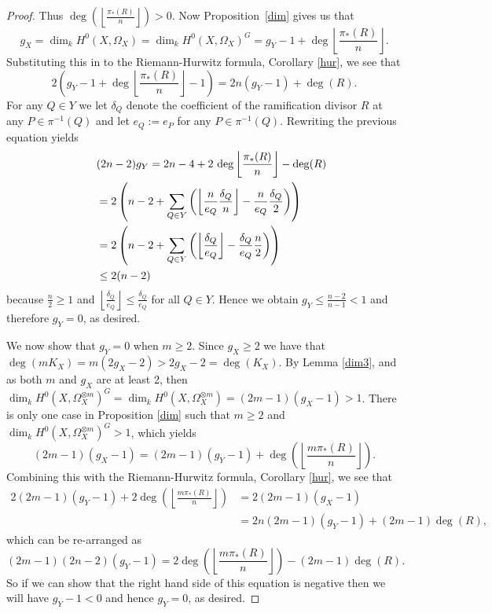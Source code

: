 \begin{proof}
    Thus $\deg\left( \left\lfloor \frac{\pi_*(R)}{n} \right\rfloor \right) >0$. 
    Now Proposition~\ref{dim} gives us that
        \begin{equation*}
        g_X=\dim_k H^0(X,\Omega_X)=\dim_k H^0(X,\Omega_X)^G= g_Y-1+\deg\left\lfloor \frac{\pi_*(R)}{n} \right\rfloor.
        \end{equation*}
    Substituting this in to the Riemann-Hurwitz formula, Corollary \ref{hur}, we see that
        \begin{equation*}
        2\left(g_Y - 1 + \deg\left \lfloor \frac{\pi_*(R)}{n} \right \rfloor -1 \right) = 2n (g_Y -1) + \deg(R).
        \end{equation*}
    For any $Q \in Y$ we let $\delta_Q$ denote the coefficient of the ramification divisor $R$ at any $P \in \pi^{-1}(Q)$ and let $e_Q := e_P$ for any $P \in \pi^{-1}(Q)$. 
    Rewriting the previous equation yields
        \begin{align*}
        \lefteqn{(2n-2)g_Y = 2n-4 + 2 \,\deg\left \lfloor \frac{\pi_*(R)}{n}\right \rfloor - \deg(R)}\\
        &= 2 \left(n-2 + \sum_{Q \in Y} \left(\left\lfloor \frac{n}{e_Q} \frac{\delta_Q}{n} \right\rfloor - \frac{n}{e_Q} \frac{\delta_Q}{2}\right) \right)\\
        &= 2 \left(n-2 + \sum_{Q \in Y} \left( \left\lfloor \frac{\delta_Q}{e_Q} \right\rfloor - \frac{\delta_Q}{e_Q} \frac{n}{2} \right)\right)\\
        & \le  2(n-2)
        \end{align*}
    because $\frac{n}{2} \ge 1$ and $\left\lfloor \frac{\delta_Q}{e_Q}\right\rfloor \le \frac{\delta_Q}{e_Q}$ for all $Q \in Y$. 
    Hence we obtain $g_Y \le \frac{n-2}{n-1} < 1$ and therefore $g_Y =0$, as desired.
    
    We now show that $g_Y=0$ when $m\geq 2$. 
    Since $g_X\geq 2$ we have that $\deg(mK_X)=m(2g_X-2)>2g_X-2=\deg(K_X)$.
    By Lemma \ref{dim3}, and as both $m$ and $g_X$ are at least 2, then $\dim_kH^0(X,\Omega_X^{\otimes m})^G=\dim_kH^0(X,\Omega_X^{\otimes m})=(2m-1)(g_X-1)>1$.
    There is only one case in Proposition \ref{dim} such that $m\geq 2$ and $\dim_k H^0(X,\Omega_X^{\otimes m})^G>1$, which yields 
        \begin{equation*}
        (2m-1)(g_X-1)=(2m-1)(g_Y-1)+\deg\left(\left\lfloor \frac{m\pi_*(R)}{n} \right\rfloor \right).
        \end{equation*}
    Combining this with the Riemann-Hurwitz formula, Corollary \ref{hur}, we see that
        \begin{align*}
        2(2m-1)(g_Y-1)+2\deg\left(\left\lfloor\frac{m\pi_*(R)}{n}\right\rfloor\right) & =  2(2m-1)(g_X-1)\\
        & =  2n(2m-1)(g_Y-1)+(2m-1)\deg(R),
        \end{align*}
    which can be re-arranged as
        \begin{equation*}
        (2m-1)(2n-2)(g_Y-1)=2\deg\left(\left\lfloor\frac{m\pi_*(R)}{n}\right\rfloor\right)-(2m-1)\deg(R).
        \end{equation*}
    So if we can show that the right hand side of this equation is negative then we will have $g_Y-1<0$ and hence $g_Y=0$, as desired.
    

\end{proof}
